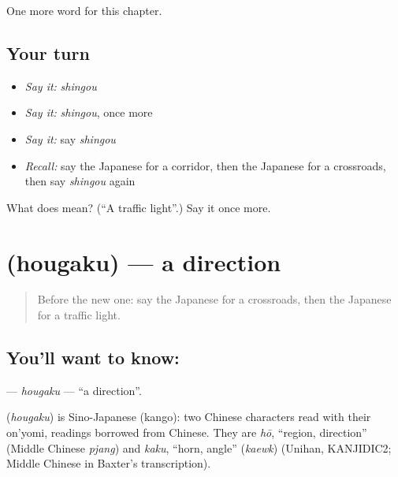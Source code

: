 \begin{grammarlens}[title={What you've built}]
One more word for this chapter.
\end{grammarlens}

\subsection*{Your turn}
\begin{itemize}
\raggedright
  \item \emph{Say it:} \emph{shingou}
  \item \emph{Say it:} \emph{shingou}, once more
  \item \emph{Say it:} say \emph{shingou}
  \item \emph{Recall:} say the Japanese for a corridor, then the Japanese for a crossroads, then say \emph{shingou} again
\end{itemize}

\begin{tcolorbox}[breakable,colback=teal!4,colframe=teal!35!black,title={Before you move on}]
What does  mean? (\textquotedblleft{}A traffic light\textquotedblright{}.) Say it once more.
\end{tcolorbox}
\section[\texorpdfstring{\ja{ほうがく} (hougaku)}{ほうがく (hougaku)}]{ (hougaku) — a direction}

\label{lesson:JA-C80-hougaku}



\begin{quote}
Before the new one: say the Japanese for a crossroads, then the Japanese for a traffic light.
\end{quote}

\subsection*{You'll want to know: }
\textbf{} — \emph{hougaku} — \textquotedblleft{}a direction\textquotedblright{}.

\begin{cousinweb}
\textbf{} (\emph{hougaku}) is Sino-Japanese (kango): two Chinese characters read with their on'yomi, readings borrowed from Chinese. They are \emph{hō}, \textquotedblleft{}region, direction\textquotedblright{} (Middle Chinese \emph{pjang}) and \emph{kaku}, \textquotedblleft{}horn, angle\textquotedblright{} (\emph{kaewk}) (Unihan, KANJIDIC2; Middle Chinese in Baxter's transcription).
\end{cousinweb}

